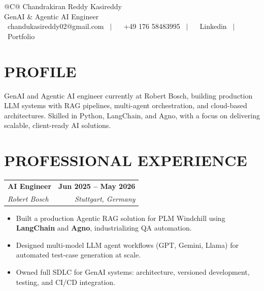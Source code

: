 \documentclass[a4paper,11pt]{article}
\makeatletter
\newcommand{\entryheader}[4]{%
  \begin{tabularx}{\textwidth}{@{}>{\RaggedRight\arraybackslash}X r@{}}
    \textbf{#1} & \textbf{#2} \\
    \textit{#3} & \textit{#4} \\
  \end{tabularx}%
}
\newenvironment{entrybullets}{%
  \begin{minipage}[t]{0.77\textwidth}
    \begin{itemize}[leftmargin=*,label=\textbullet,align=left]
}{%
    \end{itemize}
  \end{minipage}
}
\newcommand{\safehref}[2]{#2}
\let\href\safehref
\makeatother
\begin{document}
\pagestyle{empty}

\begin{tabularx}{\linewidth}{@{}C@{}}
  \Huge{Chandrakiran Reddy Kasireddy}\\[10pt]
  
  \large{GenAI \& Agentic AI Engineer}\\[3pt]


  \href{mailto: chandukasireddy02@gmail.com}{\raisebox{-0.05\height}{\faEnvelope} \ chandukasireddy02@gmail.com} \ $|$ \
  \href{tel:+49 176 58483995}{ \ +49 176 58483995} \ $|$ \
  \href{https://www.linkedin.com/in/chandukasireddy/}{\raisebox{-0.05\height}{\faLinkedin} \ Linkedin} \ $|$ \
  \href{https://chandu.graspins.com/}{\raisebox{-0.05\height}{\faLink} \ Portfolio}\\
\end{tabularx}

\section*{PROFILE}
GenAI and Agentic AI engineer currently at Robert Bosch, building production LLM systems with RAG pipelines, multi-agent orchestration, and cloud-based architectures. Skilled in Python, LangChain, and Agno, with a focus on delivering scalable, client-ready AI solutions.


\section*{PROFESSIONAL EXPERIENCE}
\entryheader{AI Engineer}{Jun 2025 -- May 2026}{Robert Bosch}{Stuttgart, Germany}
\begin{entrybullets}
  \item Built a production Agentic RAG solution for PLM Windchill using \textbf{LangChain} and \textbf{Agno}, industrializing QA automation.
  \item Designed multi-model LLM agent workflows (GPT, Gemini, Llama) for automated test-case generation at scale.
  \item Owned full SDLC for GenAI systems: architecture, versioned development, testing, and CI/CD integration.
\end{entrybullets}
\end{document}
